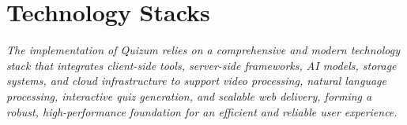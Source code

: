 \chapter{Technology Stacks}
\textit{The implementation of Quizum relies on a comprehensive and modern technology stack that integrates client-side tools, server-side frameworks, AI models, storage systems, and cloud infrastructure to support video processing, natural language processing, interactive quiz generation, and scalable web delivery, forming a robust, high-performance foundation for an efficient and reliable user experience.}









